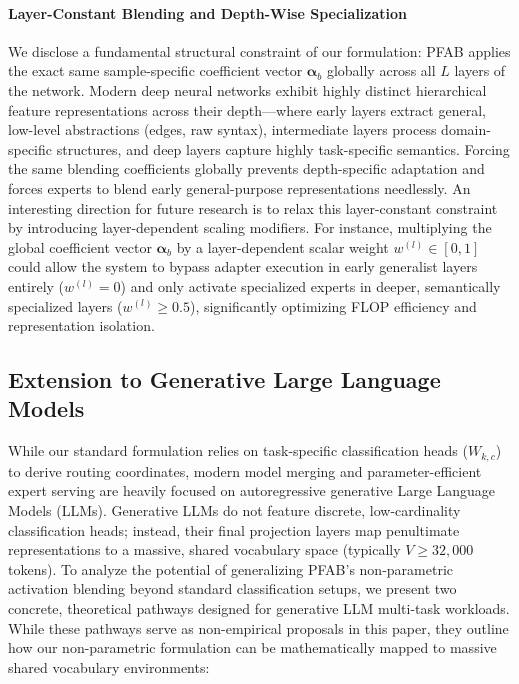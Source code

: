 \paragraph{Layer-Constant Blending and Depth-Wise Specialization}
We disclose a fundamental structural constraint of our formulation: \textsc{PFAB} applies the exact same sample-specific coefficient vector $\boldsymbol{\alpha}_b$ globally across all $L$ layers of the network. Modern deep neural networks exhibit highly distinct hierarchical feature representations across their depth—where early layers extract general, low-level abstractions (edges, raw syntax), intermediate layers process domain-specific structures, and deep layers capture highly task-specific semantics. Forcing the same blending coefficients globally prevents depth-specific adaptation and forces experts to blend early general-purpose representations needlessly. An interesting direction for future research is to relax this layer-constant constraint by introducing layer-dependent scaling modifiers. For instance, multiplying the global coefficient vector $\boldsymbol{\alpha}_b$ by a layer-dependent scalar weight $w^{(l)} \in [0, 1]$ could allow the system to bypass adapter execution in early generalist layers entirely ($w^{(l)} = 0$) and only activate specialized experts in deeper, semantically specialized layers ($w^{(l)} \ge 0.5$), significantly optimizing FLOP efficiency and representation isolation.

\subsection{Extension to Generative Large Language Models}
\label{sec:llm_extension}

While our standard formulation relies on task-specific classification heads ($W_{k,c}$) to derive routing coordinates, modern model merging and parameter-efficient expert serving are heavily focused on autoregressive generative Large Language Models (LLMs). Generative LLMs do not feature discrete, low-cardinality classification heads; instead, their final projection layers map penultimate representations to a massive, shared vocabulary space (typically $V \ge 32,000$ tokens). To analyze the potential of generalizing \textsc{PFAB}'s non-parametric activation blending beyond standard classification setups, we present two concrete, theoretical pathways designed for generative LLM multi-task workloads. While these pathways serve as non-empirical proposals in this paper, they outline how our non-parametric formulation can be mathematically mapped to massive shared vocabulary environments:

